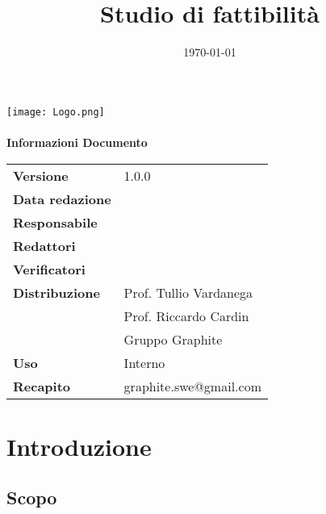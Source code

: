 \documentclass[openany,12pt,a4paper]{report}
\title{Studio di fattibilità}
\author{}
\date{\today}
\begin{document}
	\makeatletter
	\begin{titlepage}
		\setlength{\headsep}{0pt}
		\begin{center}
			\texttt{[image: Logo.png]}\\[1em]
			{\huge \bfseries  \@title }\\[10ex]
			\textbf{\Large Informazioni Documento} \\[2em]
			\bgroup
			\def\arraystretch{1.5}
			\begin{tabular}{l|l}
				\textbf{Versione} & 1.0.0 \\
				\textbf{Data redazione} & \large \@date \\
				\textbf{Responsabile} &  \\
				\textbf{Redattori} &  \\
				\textbf{Verificatori} &  \\
				\textbf{Distribuzione} & Prof. Tullio Vardanega \\
				& Prof. Riccardo Cardin \\
				& Gruppo Graphite \\
				\textbf{Uso} & Interno \\
				\textbf{Recapito} & graphite.swe@gmail.com \\
			\end{tabular}
			\egroup
		\end{center}
	\end{titlepage}
	\makeatother

	\thispagestyle{empty}
	\newpage


	\tableofcontents{}
	
	
	\begin{versionhistory}
		
		
	\end{versionhistory}


	\chapter{Introduzione}

	\section{Scopo}
\end{document}
